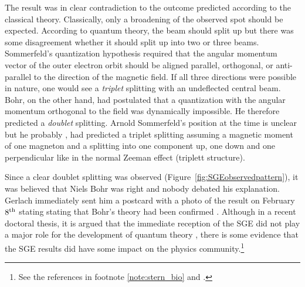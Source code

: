 \documentclass[12pt]{article}
\begin{document}
The result was in clear contradiction to the outcome predicted according to the classical theory. Classically, only a broadening of the observed spot should be expected. According to quantum theory, the beam should split up but there was some disagreement whether it should split up into two or three beams. Sommerfeld's quantization hypothesis required that the angular momentum vector of the outer electron orbit should be aligned parallel, orthogonal, or anti-parallel to the direction of the magnetic field. If all three directions were possible in nature, one would see a \emph{triplet} splitting with an undeflected central beam. Bohr, on the other hand, had postulated that a quantization with the angular momentum orthogonal to the field was dynamically impossible. He therefore predicted a \emph{doublet} splitting. Arnold Sommerfeld's position at the time is unclear but he probably \citep{SommerfeldA1920Zahlenmysterium,SommerfeldA1920Gesetze}, \cite[p.~541]{SommerfeldA1921Atombau2} had predicted a triplet splitting assuming a magnetic moment of one magneton and a splitting into one component up, one down and one perpendicular like in the normal Zeeman effect (triplett structure). 

Since a clear doublet splitting was observed (Figure~\ref{fig:SGEobservedpattern}), it was believed that Niels Bohr was right and nobody debated his explanation. Gerlach immediately sent him a postcard with a photo of the result on February $8^{\rm th}$ stating stating that Bohr's theory had been confirmed \citep{GerlachW1969Stern,GerlachW1969Entdeckung,FriedrichBEtal2003Stern}. Although in a recent doctoral thesis, it is argued that the immediate reception of the SGE did not play a major role for the development of quantum theory \citep{Pie2015Experiment}, there is some evidence that the SGE results did have some impact on the physics community.\footnote{See the references in footnote \ref{note:stern_bio} and \citep{GerlachW1969Stern}.} 
\end{document}
